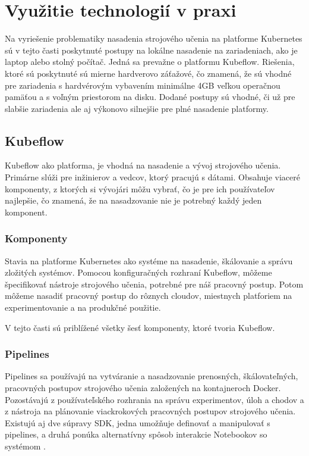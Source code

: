 
\chapter{Využitie technologií v praxi}
\label{methodology}

Na vyriešenie problematiky nasadenia strojového učenia na platforme Kubernetes sú v tejto časti poskytnuté postupy na lokálne nasadenie na zariadeniach, ako je laptop alebo stolný počítač. Jedná sa prevažne o platformu Kubeflow. Riešenia, ktoré sú poskytnuté sú mierne hardverovo záťažové, čo znamená, že sú vhodné pre zariadenia s hardvérovým vybavením minimálne 4GB veľkou operačnou pamäťou a s voľným priestorom na disku. Dodané postupy sú vhodné, či už pre slabšie zariadenia ale aj výkonovo silnejšie pre plné nasadenie platformy.

\section{Kubeflow}
Kubeflow ako platforma, je vhodná na nasadenie a vývoj strojového učenia. Primárne slúži pre inžinierov a vedcov, ktorý pracujú s dátami. Obsahuje viaceré komponenty, z ktorých si vývojári môžu vybrať, čo je pre ich používateľov najlepšie, čo znamená, že na nasadzovanie nie je potrebný každý jeden komponent.

\subsection{Komponenty}

Stavia na platforme Kubernetes ako systéme na nasadenie, škálovanie a správu zložitých systémov. Pomocou konfiguračných rozhraní Kubeflow, môžeme špecifikovať nástroje strojového učenia, potrebné pre náš pracovný postup. Potom môžeme nasadiť pracovný postup do rôznych cloudov, miestnych platforiem na experimentovanie a na produkčné použitie.

V tejto časti sú priblížené všetky šesť komponenty, ktoré tvoria Kubeflow.


\subsection*{Pipelines}

Pipelines sa používajú na vytváranie a nasadzovanie prenosných, škálovateľných, pracovných postupov strojového učenia založených na kontajneroch Docker. Pozostávajú z používateľského rozhrania na správu experimentov, úloh a chodov a z nástroja na plánovanie viackrokových pracovných postupov strojového učenia. Existujú aj dve súpravy SDK, jedna umožňuje definovať a manipulovať s pipelines, a druhá ponúka alternatívny spôsob interakcie Notebookov so systémom \cite{pipe}.

